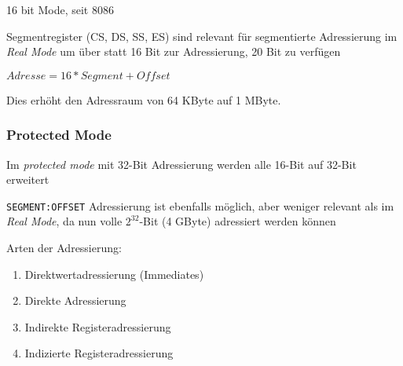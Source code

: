 16 bit Mode, seit 8086

Segmentregister (CS, DS, SS, ES) sind relevant für segmentierte Adressierung im
\emph{Real Mode} um über statt 16 Bit zur Adressierung, 20 Bit zu verfügen

$Adresse = 16 * Segment + Offset$

Dies erhöht den Adressraum von 64 KByte auf 1 MByte.


\subsubsection{Protected Mode}
Im \emph{protected mode} mit 32-Bit Adressierung werden alle 16-Bit auf 32-Bit erweitert

\texttt{SEGMENT:OFFSET} Adressierung ist ebenfalls möglich, aber weniger relevant als im
\emph{Real Mode}, da nun volle $2^{32}$-Bit (4 GByte) adressiert werden können




Arten der Adressierung:

\begin{enumerate}
\item Direktwertadressierung (Immediates)
\item Direkte Adressierung
\item Indirekte Registeradressierung
\item Indizierte Registeradressierung
\end{enumerate}


